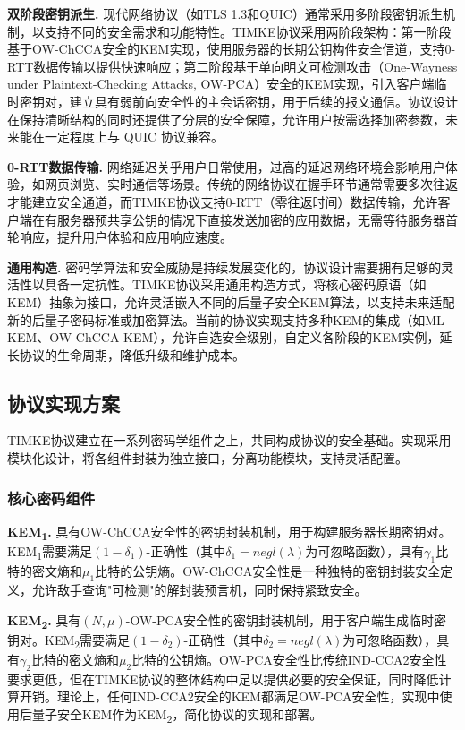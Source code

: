 \textbf{双阶段密钥派生.} 现代网络协议（如TLS 1.3和QUIC）通常采用多阶段密钥派生机制，以支持不同的安全需求和功能特性。TIMKE协议采用两阶段架构：第一阶段基于OW-ChCCA安全的KEM实现，使用服务器的长期公钥构件安全信道，支持0-RTT数据传输以提供快速响应；第二阶段基于单向明文可检测攻击（One-Wayness under Plaintext-Checking Attacks, OW-PCA）安全的KEM实现，引入客户端临时密钥对，建立具有弱前向安全性的主会话密钥，用于后续的报文通信。协议设计在保持清晰结构的同时还提供了分层的安全保障，允许用户按需选择加密参数，未来能在一定程度上与 QUIC 协议兼容。
    
\textbf{0-RTT数据传输.} 网络延迟关乎用户日常使用，过高的延迟网络环境会影响用户体验，如网页浏览、实时通信等场景。传统的网络协议在握手环节通常需要多次往返才能建立安全通道，而TIMKE协议支持0-RTT（零往返时间）数据传输，允许客户端在有服务器预共享公钥的情况下直接发送加密的应用数据，无需等待服务器首轮响应，提升用户体验和应用响应速度。

\textbf{通用构造.} 密码学算法和安全威胁是持续发展变化的，协议设计需要拥有足够的灵活性以具备一定抗性。TIMKE协议采用通用构造方式，将核心密码原语（如KEM）抽象为接口，允许灵活嵌入不同的后量子安全KEM算法，以支持未来适配新的后量子密码标准或加密算法。当前的协议实现支持多种KEM的集成（如ML-KEM、OW-ChCCA KEM），允许自选安全级别，自定义各阶段的KEM实例，延长协议的生命周期，降低升级和维护成本。

\subsection{协议实现方案}

TIMKE协议建立在一系列密码学组件之上，共同构成协议的安全基础。实现采用模块化设计，将各组件封装为独立接口，分离功能模块，支持灵活配置。

\subsubsection{核心密码组件}
\textbf{KEM\textsubscript{1}.} 具有OW-ChCCA安全性的密钥封装机制，用于构建服务器长期密钥对。KEM\textsubscript{1}需要满足$(1-\delta_1)$-正确性（其中$\delta_1 = negl(\lambda)$为可忽略函数），具有$\gamma_1$比特的密文熵和$\mu_1$比特的公钥熵。OW-ChCCA安全性是一种独特的密钥封装安全定义，允许敌手查询"可检测"的解封装预言机，同时保持紧致安全。

\textbf{KEM\textsubscript{2}.} 具有$(N,\mu)$-OW-PCA安全性的密钥封装机制，用于客户端生成临时密钥对。KEM\textsubscript{2}需要满足$(1-\delta_2)$-正确性（其中$\delta_2 = negl(\lambda)$为可忽略函数），具有$\gamma_2$比特的密文熵和$\mu_2$比特的公钥熵。OW-PCA安全性比传统IND-CCA2安全性要求更低，但在TIMKE协议的整体结构中足以提供必要的安全保证，同时降低计算开销。理论上，任何IND-CCA2安全的KEM都满足OW-PCA安全性，实现中使用后量子安全KEM作为KEM\textsubscript{2}，简化协议的实现和部署。

